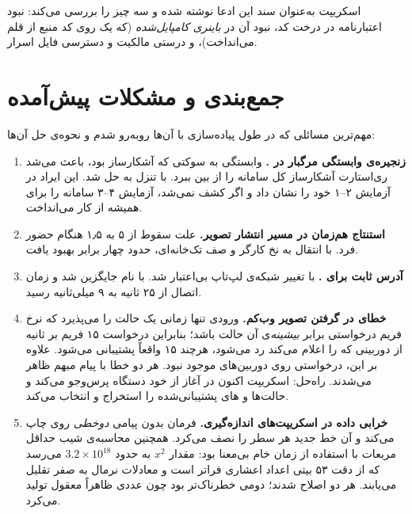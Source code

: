 اسکریپت  به‌عنوان سند این ادعا نوشته شده و سه چیز را بررسی می‌کند: نبود اعتبارنامه در درخت کد، نبود آن در \emph{باینری کامپایل‌شده} (که یک  روی کد منبع از قلم می‌انداخت)، و درستی مالکیت و دسترسی فایل اسرار.

\section{جمع‌بندی و مشکلات پیش‌آمده}

مهم‌ترین مسائلی که در طول پیاده‌سازی با آن‌ها روبه‌رو شدم و نحوه‌ی حل آن‌ها:

\begin{enumerate}
	\item \textbf{زنجیره‌ی وابستگی مرگبار در .} وابستگی  به سوکتی که  آشکارساز بود، باعث می‌شد ری‌استارت آشکارساز کل سامانه را از بین ببرد. با تنزل به  حل شد. این ایراد در آزمایش ۲--۱ خود را نشان داد و اگر کشف نمی‌شد، آزمایش ۴--۳ سامانه را برای همیشه از کار می‌انداخت.

	\item \textbf{استنتاج هم‌زمان در مسیر انتشار تصویر.} علت سقوط  از ۵ به ۱٫۵ هنگام حضور فرد. با انتقال به نخ کارگر و صف تک‌خانه‌ای، حدود چهار برابر بهبود یافت.

	\item \textbf{آدرس  ثابت برای .} با تغییر شبکه‌ی لپ‌تاپ بی‌اعتبار شد. با نام  جایگزین شد و زمان اتصال از ۲۵ ثانیه به ۹ میلی‌ثانیه رسید.

	\item \textbf{خطای  در گرفتن تصویر وب‌کم.} ورودی  تنها زمانی یک حالت را می‌پذیرد که نرخ فریم درخواستی برابر \emph{بیشینه}‌ی آن حالت باشد؛ بنابراین درخواست ۱۵ فریم بر ثانیه از دوربینی که \lr{[15 30]} را اعلام می‌کند رد می‌شود، هرچند ۱۵ واقعاً پشتیبانی می‌شود. علاوه بر این،  درخواستی روی دوربین‌های  موجود نبود. هر دو خطا با پیام مبهم  ظاهر می‌شدند. راه‌حل: اسکریپت اکنون در آغاز از خود دستگاه پرس‌وجو می‌کند و حالت‌ها و های پشتیبانی‌شده را استخراج و انتخاب می‌کند.

	\item \textbf{خرابی داده در اسکریپت‌های اندازه‌گیری.} فرمان  بدون  پیامی \emph{دوخطی} روی  چاپ می‌کند و آن خط جدید هر سطر  را نصف می‌کرد. همچنین محاسبه‌ی شیب حداقل مربعات با استفاده از زمان  خام بی‌معنا بود: مقدار $x^2$ به حدود $3.2\times10^{18}$ می‌رسد که از دقت ۵۳ بیتی اعداد اعشاری فراتر است و معادلات نرمال به صفر تقلیل می‌یابند. هر دو اصلاح شدند؛ دومی خطرناک‌تر بود چون عددی ظاهراً معقول تولید می‌کرد.


\end{enumerate}
